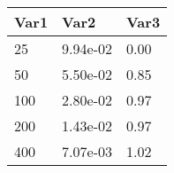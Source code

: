 \begin{tabular}{lll}
Var1 & Var2 & Var3 \\ 
\hline 
25 & 9.94e-02 & 0.00 \\ 
50 & 5.50e-02 & 0.85 \\ 
100 & 2.80e-02 & 0.97 \\ 
200 & 1.43e-02 & 0.97 \\ 
400 & 7.07e-03 & 1.02 \\ 
\hline 
\end{tabular}